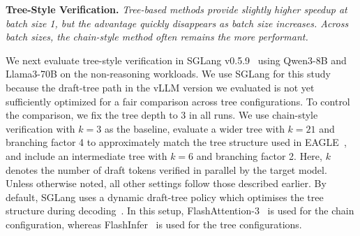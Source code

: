 \begin{quoting}[leftmargin=1.5em, rightmargin=1.5em, vskip=0pt]
\textbf{Tree-Style Verification.}
\emph{Tree-based methods provide slightly higher speedup at batch size 1, but the advantage quickly disappears as batch size increases. Across batch sizes, the chain-style method often remains the more performant.}
\end{quoting}


We next evaluate tree-style verification in SGLang v0.5.9~\cite{zheng2024sglang} using Qwen3-8B and Llama3-70B on the non-reasoning workloads. We use SGLang for this study because the draft-tree path in the vLLM version we evaluated is not yet sufficiently optimized for a fair comparison across tree configurations. To control the comparison, we fix the tree depth to 3 in all runs. We use chain-style verification with $k{=}3$ as the baseline, evaluate a wider tree with $k{=}21$ and branching factor 4 to approximately match the tree structure used in EAGLE~\cite{li2024eagle}, and include an intermediate tree with $k{=}6$ and branching factor 2. Here, $k$ denotes the number of draft tokens verified in parallel by the target model. Unless otherwise noted, all other settings follow those described earlier. By default, SGLang uses a dynamic draft-tree policy which optimises the tree structure during decoding~\cite{li2024eagle}. In this setup, FlashAttention-3~\cite{shah2024flashattention} is used for the chain configuration, whereas FlashInfer~\cite{ye2025flashinfer} is used for the tree configurations.

